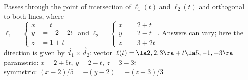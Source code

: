{Passes through the point of intersection of $\ell_1(t)$ and $\ell_2(t)$ and orthogonal to both lines, where\\
$\ell_1 = \left\{\begin{aligned} x&=t\\y&=-2+2t\\z&=1+t\end{aligned}\right.$ \quad and \quad 
$\ell_2 = \left\{\begin{aligned} x&=2+t\\y&=2-t\\z&=3+2t\end{aligned}\right.$.
}
{Answers can vary; here the direction is given by $\vec d_1\times \vec d_2$:
vector: $\ell(t) = \la 2,2,3\ra + t\la 5,-1,-3\ra$\\
parametric: $x= 2+5t$, $y=2-t$, $z = 3-3t$\\
symmetric: $(x-2)/5=-(y-2)=-(z-3)/3$
}

